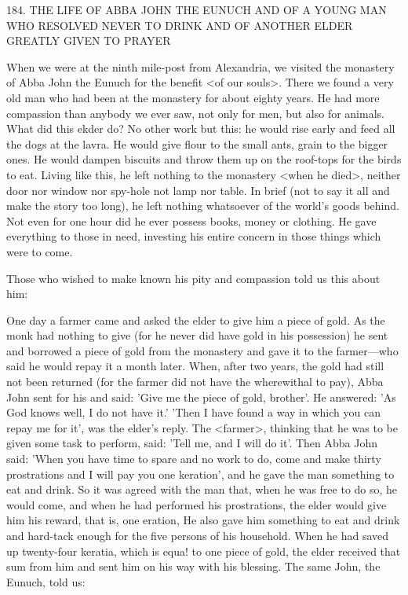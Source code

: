184. THE LIFE OF ABBA JOHN THE EUNUCH
AND OF A YOUNG MAN WHO RESOLVED NEVER TO DRINK
AND OF ANOTHER ELDER GREATLY GIVEN TO PRAYER

When we were at the ninth mile-post from Alexandria, we visited
the monastery of Abba John the Eunuch for the benefit <of our
souls>. There we found a very old man who had been at the
monastery for about eighty years. He had more compassion than
anybody we ever saw, not only for men, but also for animals. What
did this ekder do? No other work but this: he would rise early and
feed all the dogs at the lavra. He would give flour to the small ants,
grain to the bigger ones. He would dampen biscuits and throw them
up on the roof-tops for the birds to eat. Living like this, he left
nothing to the monastery <when he died>, neither door nor window
nor spy-hole not lamp nor table. In brief (not to say it all and make
the story too long), he left nothing whatsoever of the world's goods
behind. Not even for one hour did he ever possess books, money or
clothing. He gave everything to those in need, investing his entire
concern in those things which were to come.

Those who wished to make known his pity and compassion told
us this about him:

One day a farmer came and asked the elder to give him a piece of
gold. As the monk had nothing to give (for he never did have gold
in his possession) he sent and borrowed a piece of gold from the
monastery and gave it to the farmer—who said he would repay it
a month later. When, after two years, the gold had still not been
returned (for the farmer did not have the wherewithal to pay), Abba
John sent for his and said: 'Give me the piece of gold, brother'. He
answered: 'As God knows well, I do not have it.' 'Then I have
found a way in which you can repay me for it', was the elder's
reply. The <farmer>, thinking that he was to be given some task to
perform, said: 'Tell me, and I will do it'. Then Abba John said:
'When you have time to spare and no work to do, come and make
thirty prostrations and I will pay you one keration', and he gave the
man something to eat and drink. So it was agreed with the man
that, when he was free to do so, he would come, and when he had
performed his prostrations, the elder would give him his reward,
that is, one eration, He also gave him something to eat and drink
and hard-tack enough for the five persons of his household. When
he had saved up twenty-four keratia, which is equa! to one piece of
gold, the elder received that sum from him and sent him on his way
with his blessing.
The same John, the Eunuch, told us:

